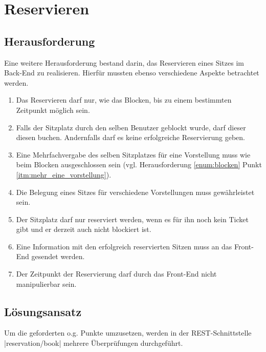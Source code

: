 \section{Reservieren}
\label{sec:reservieren}

\subsection{Herausforderung}
\label{ssec:herausforderung_reservieren}

Eine weitere Herausforderung bestand darin, das Reservieren eines Sitzes im Back-End zu realisieren.
Hierfür mussten ebenso verschiedene Aspekte betrachtet werden.

\begin{enumerate}
	\label{enum:reservieren}
	\item \label{itm:zeitpunkt_reservieren}Das Reservieren darf nur, wie das Blocken, bis zu einem bestimmten Zeitpunkt möglich sein.
	\item \label{itm:geblockt_durch_benutzer} Falls der Sitzplatz durch den selben Benutzer geblockt wurde, darf dieser diesen buchen.
	Andernfalls darf es keine erfolgreiche Reservierung geben.
	\item \label{itm:mehr_eine_vorstellung_reservieren}Eine Mehrfachvergabe des selben Sitzplatzes für eine Vorstellung muss wie beim Blocken ausgeschlossen sein (vgl. Herausforderung \ref{enum:blocken} Punkt \ref{itm:mehr_eine_vorstellung}).
	\item \label{itm:mehr_mehrere_vorstellungen_reservieren}Die Belegung eines Sitzes für verschiedene Vorstellungen muss gewährleistet sein.
	\item \label{itm:ticket_reservieren} Der Sitzplatz darf nur reserviert werden, wenn es für ihn noch kein Ticket gibt und er derzeit auch nicht blockiert ist.
	\item \label{itm:front_end_reservieren} Eine Information mit den erfolgreich reservierten Sitzen muss an das Front-End gesendet werden.
	\item \label{itm:zeit_reservieren} Der Zeitpunkt der Reservierung darf durch das Front-End nicht manipulierbar sein.
\end{enumerate}

\subsection{Lösungsansatz}
\label{ssec:loesung_reservieren}

Um die geforderten o.g. Punkte umzusetzen, werden in der \acs{REST}-Schnittstelle \\\jinline |reservation/book| mehrere Überprüfungen durchgeführt.

